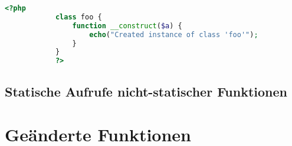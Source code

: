         \begin{lstlisting}[language=php, caption={Beispiel eines expliziten Konstruktors}, label={lst:php5construct}]
            <?php
            class foo {
                function __construct($a) {
                    echo("Created instance of class 'foo'");
                }
            }
            ?>
        \end{lstlisting}
    
    \subsection{Statische Aufrufe nicht-statischer Funktionen}
    

\section{Geänderte Funktionen}

\section{}
